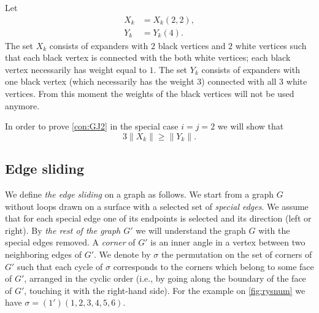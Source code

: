 \documentclass[submission]{FPSAC2021}
\begin{document}
Let 
\begin{align}
\label{xdef}
X_k &= X_k(2, 2), \\
\label{ydef}
Y_k &= Y_k(4).
\end{align}
The set $X_k$ consists of expanders with $2$ black vertices and $2$ white vertices
such that each black vertex is connected with the both white vertices;
each black vertex necessarily has weight equal to $1$.
The set $Y_k$ consists of expanders with one black vertex (which necessarily has the weight $3$) connected
with all $3$ white vertices. From this moment the weights of the black vertices
will not be used anymore.

In order to prove \cref{con:GJ2} in the special case $i=j=2$ we will show that 
$$3\big\|X_k\big\| \geq \big\|Y_k\big\|.$$

\subsection{Edge sliding}

We define \emph{the edge sliding} on a graph as follows. We start from a graph
$G$ without loops drawn on a surface with a selected set of \emph{special
    edges}. We assume that for each special edge one of its endpoints is selected
 and its direction
(left or right).  By \emph{the rest of the graph $G'$} we will understand the
graph $G$ with the special edges removed.  A \emph{corner} of $G'$
is an inner angle in a vertex between two neighboring edges of $G'$. We denote
by $\sigma$ the permutation on the set of corners of $G'$ such that each cycle
of $\sigma$ corresponds to the corners which belong to some face of $G'$,
arranged in the  cyclic order (i.e., by going
along the boundary of the face of $G'$, touching it with the right-hand side).
For the example on \cref{fig:rysnum} we have $\sigma = ( 1' )( 1, 2, 3, 4, 5, 6
).$
\end{document}
